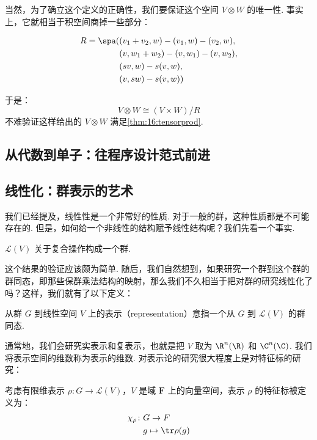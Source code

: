 当然，为了确立这个定义的正确性，我们要保证这个空间 $V \otimes W$ 的唯一性. 事实上，它就相当于积空间商掉一些部分：

\begin{align*}
    R = \spa ( & (v_1 + v_2, w) - (v_1, w) - (v_2, w), \\
               & (v, w_1 + w_2) - (v, w_1) - (v, w_2), \\
               & (sv, w) - s(v, w),                    \\
               & (v, sw) - s(v, w))
\end{align*}

于是：
\[ V \otimes W \cong (V \times W) / R \]
不难验证这样给出的 $V \otimes W$ 满足\autoref{thm:16:tensorprod}.

\subsection{从代数到单子：往程序设计范式前进}

\subsection{线性化：群表示的艺术}

我们已经提及，线性性是一个非常好的性质. 对于一般的群，这种性质都是不可能存在的. 但是，如何给一个非线性的结构赋予线性结构呢？我们先看一个事实.

\begin{lemma}
    $\mathcal{L}(V)$ 关于复合操作构成一个群.
\end{lemma}

这个结果的验证应该颇为简单. 随后，我们自然想到，如果研究一个群到这个群的群同态，即那些保群乘法结构的映射，那么我们不久相当于把对群的研究线性化了吗？这样，我们就有了以下定义：

\begin{definition}
    从群 $G$ 到线性空间 $V$ 上的表示（representation）意指一个从 $G$ 到 $\mathcal{L}(V)$ 的群同态.
\end{definition}

通常地，我们会研究实表示和复表示，也就是把 $V$ 取为 $\R^n(\R)$ 和 $\C^n(\C)$. 我们将表示空间的维数称为表示的维数. 对表示论的研究很大程度上是对特征标的研究：

\begin{definition}
    考虑有限维表示 $\rho: G \to \mathcal{L}(V)$，$V$ 是域 $\mathbf{F}$ 上的向量空间，表示 $\rho$ 的特征标被定义为：
    \begin{align*}
        \chi_\rho \colon & G \to F                 \\
                         & g  \mapsto  \tr \rho(g)
    \end{align*}
\end{definition}

